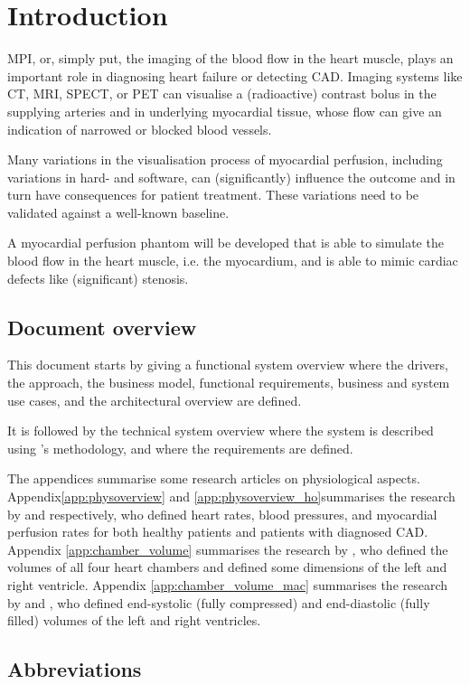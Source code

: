 \chapter{Introduction}
\label{ch:Intro}

\Ac{MPI}, or, simply put, the imaging of the blood flow in the heart muscle, plays an important role in diagnosing heart failure or detecting \ac{CAD}. Imaging systems like \ac{CT}, \ac{MRI}, \ac{SPECT}, or \ac{PET} can visualise a (radioactive) contrast bolus in the supplying arteries and in underlying myocardial tissue, whose flow can give an indication of narrowed or blocked blood vessels.

Many variations in the visualisation process of myocardial perfusion, including variations in hard- and software, can (significantly) influence the outcome and in turn have consequences for patient treatment. These variations need to be validated against a well-known baseline.

A myocardial perfusion phantom will be developed that is able to simulate the blood flow in the heart muscle, i.e. the myocardium, and is able to mimic cardiac defects like (significant) stenosis.

\section*{Document overview}
\label{sec:doc_overview}
This document starts by giving a functional system overview where the drivers, the approach, the business model, functional requirements, business and system use cases, and the architectural overview are defined. 

It is followed by the technical system overview where the system is described using \cite{van2011modeling}'s methodology, and where the requirements are defined.

The appendices summarise some research articles on physiological aspects. Appendix\ref{app:physoverview} and \ref{app:physoverview_ho}summarises the research by \cite{uren1994relation} and \cite{ho2014dynamic} respectively, who defined heart rates, blood pressures, and myocardial perfusion rates for both healthy patients and patients with diagnosed CAD. Appendix \ref{app:chamber_volume} summarises the research by \cite{lin2008cardiac}, who defined the volumes of all four heart chambers and defined some dimensions of the left and right ventricle. Appendix \ref{app:chamber_volume_mac} summarises the research by \cite{maceira2006normalizedleft} and \cite{maceira2006normalizedright}, who defined end-systolic (fully compressed) and end-diastolic (fully filled) volumes of the left and right ventricles.

\section*{Abbreviations}
\begin{multicols}{2}
	\printacronyms[include-classes=abbrev, name=Abbreviations, heading=none]
\end{multicols}